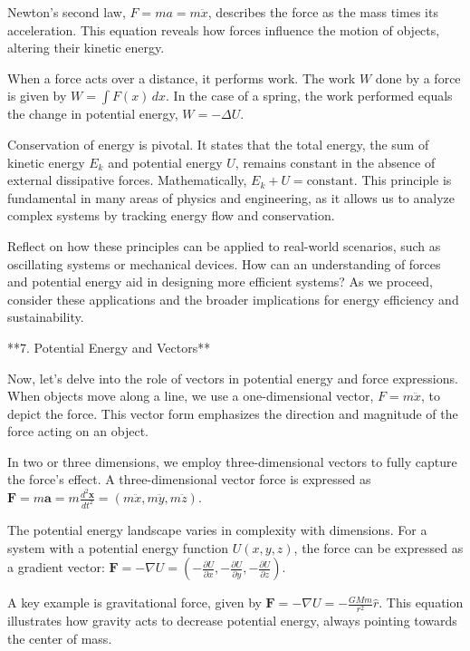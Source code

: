 \begin{tcolorbox}[size=title,opacityfill=0.05,breakable]
Newton's second law, \( F = ma = m\ddot{x} \), describes the force as the mass times its acceleration. This equation reveals how forces influence the motion of objects, altering their kinetic energy.

When a force acts over a distance, it performs work. The work \( W \) done by a force is given by \( W = \int F(x) \, dx \). In the case of a spring, the work performed equals the change in potential energy, \( W = -\Delta U \).

Conservation of energy is pivotal. It states that the total energy, the sum of kinetic energy \( E_k \) and potential energy \( U \), remains constant in the absence of external dissipative forces. Mathematically, \( E_k + U = \text{constant} \). This principle is fundamental in many areas of physics and engineering, as it allows us to analyze complex systems by tracking energy flow and conservation.

Reflect on how these principles can be applied to real-world scenarios, such as oscillating systems or mechanical devices. How can an understanding of forces and potential energy aid in designing more efficient systems? As we proceed, consider these applications and the broader implications for energy efficiency and sustainability.

**7. Potential Energy and Vectors**

Now, let's delve into the role of vectors in potential energy and force expressions. When objects move along a line, we use a one-dimensional vector, \( F = m\ddot{x} \), to depict the force. This vector form emphasizes the direction and magnitude of the force acting on an object.

In two or three dimensions, we employ three-dimensional vectors to fully capture the force's effect. A three-dimensional vector force is expressed as \( \mathbf{F} = m\mathbf{a} = m \frac{d^2\mathbf{x}}{dt^2} = (m\ddot{x}, m\ddot{y}, m\ddot{z}) \).

The potential energy landscape varies in complexity with dimensions. For a system with a potential energy function \( U(x, y, z) \), the force can be expressed as a gradient vector: \( \mathbf{F} = -\nabla U = \left(-\frac{\partial U}{\partial x}, -\frac{\partial U}{\partial y}, -\frac{\partial U}{\partial z}\right) \).

A key example is gravitational force, given by \( \mathbf{F} = -\nabla U = -\frac{GMm}{r^2} \hat{r} \). This equation illustrates how gravity acts to decrease potential energy, always pointing towards the center of mass.


\end{tcolorbox}
